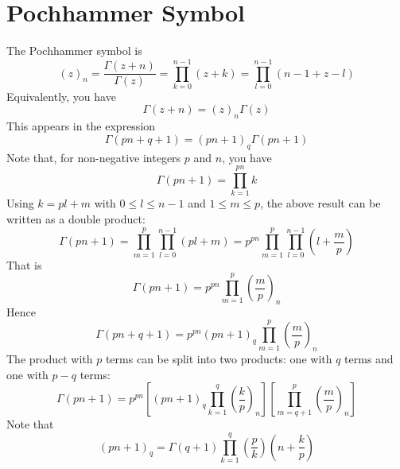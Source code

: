 \section{Pochhammer Symbol}
The Pochhammer symbol is
\begin{equation}
	\left(z\right)_{n} = \frac{\Gamma(z + n)}{\Gamma(z)} = \prod_{k = 0}^{n-1} \left(z + k\right) = \prod_{l = 0}^{n-1} \left(n - 1 + z - l\right)
\end{equation}
Equivalently, you have
\begin{equation}
	\Gamma(z + n) = \left(z\right)_{n} \Gamma(z)
\end{equation}
This appears in the expression
\begin{equation}
	\Gamma\left(pn+q+1\right) = \left(pn+1\right)_{q} \Gamma\left(pn+1\right)
\end{equation}
Note that, for non-negative integers $p$ and $n$, you have
\begin{equation}
	\Gamma\left(pn+1\right) = \prod_{k=1}^{pn} k
\end{equation}
Using $k = pl + m$ with $0 \leq l \leq n - 1$ and $1 \leq m \leq p$, the above result can be written as a double product:
\begin{equation}
	\Gamma\left(pn+1\right) = \prod_{m = 1}^{p} \prod_{l = 0}^{n-1} \left(p l + m\right) = p^{pn} \prod_{m = 1}^{p} \prod_{l = 0}^{n-1} \left(l + \frac{m}{p}\right)
\end{equation}
That is
\begin{equation}
	\Gamma\left(pn+1\right) = p^{pn} \prod_{m = 1}^{p} \left(\frac{m}{p}\right)_{n}
\end{equation}
Hence
\begin{equation}
	\Gamma\left(pn+q+1\right) = p^{pn} \left(pn+1\right)_{q} \prod_{m = 1}^{p} \left(\frac{m}{p}\right)_{n}
\end{equation}
The product with $p$ terms can be split into two products: one with $q$ terms and one with $p-q$ terms:
\begin{equation}
	\Gamma\left(pn+1\right) = p^{pn} \left[\left(pn+1\right)_{q} \prod_{k = 1}^{q} \left(\frac{k}{p}\right)_{n}\right] \left[\prod_{m = q+1}^{p} \left(\frac{m}{p}\right)_{n}\right]
\end{equation}
Note that
\begin{equation}
	\left(pn+1\right)_{q} = \Gamma\left(q + 1\right) \prod_{k = 1}^{q} \left(\frac{p}{k}\right) \left(n + \frac{k}{p}\right)
\end{equation}
